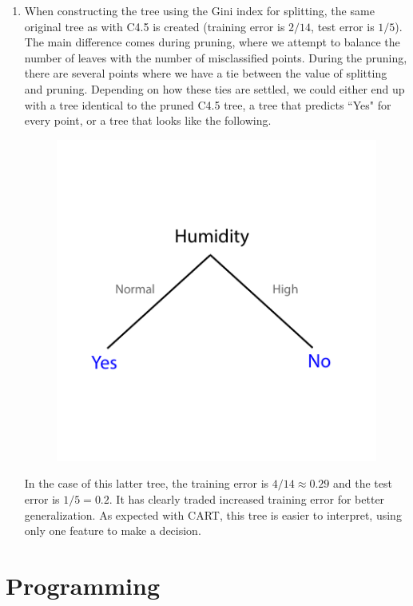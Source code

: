 \documentclass{article}
\begin{document}
\begin{enumerate}
	\item 
		When constructing the tree using the Gini index for splitting, the same original tree as with C4.5 is created (training error is $2/14$, test error is $1/5$). The main difference comes during pruning, where we attempt to balance the number of leaves with the number of misclassified points. During the pruning, there are several points where we have a tie between the value of splitting and pruning. Depending on how these ties are settled, we could either end up with a tree identical to the pruned C4.5 tree, a tree that predicts ``Yes" for every point, or a tree that looks like the following.
		\begin{figure}[H]
			\centering
			\includegraphics[scale=0.75]{img/cart-tree.pdf}
		\end{figure}

		In the case of this latter tree, the training error is $4/14 \approx 0.29$ and the test error is $1/5 = 0.2$. It has clearly traded increased training error for better generalization. As expected with CART, this tree is easier to interpret, using only one feature to make a decision.
\end{enumerate}


\section{Programming}
\end{document}
